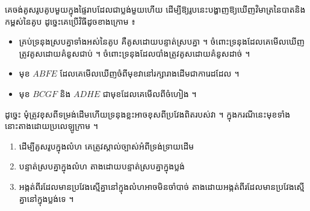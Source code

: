 \begin{example}[ឧទាហរណ៍]
គេចង់គូសរូបគូបមួយក្នុងផ្ទៃរាបដែលជាប្លង់មួយហើយ ដើម្បីឱ្យរូបនេះបង្ហាញឱ្យឃើញវិមាត្រនៃបាតនិងកម្ពស់នៃគូប ដូច្នេះគេប្រើវិធីដូចខាងក្រោម ៖
\end{example}
\begin{center}
\end{center}
\begin{itemize}
  \item គ្រប់ទ្រនុងស្របគ្នាទាំងអស់នៃគូប គឺគូសដោយបន្ទាត់ស្របគ្នា ។ ចំពោះទ្រនុងដែលគេមើលឃើញ ត្រូវគូសដោយគំនូសជាប់ ។ ចំពោះទ្រនុងដែលបាំងត្រូវគូសដោយគំនូសដាច់ ។
  \item មុខ $ABFE$ ដែលគេមើលឃើញចំពីមុខវានៅរក្សារាងដើមជាការេដដែល ។
  \item មុខ $BCGF$ និង $ADHE$ ជាមុខដែលគេមើលពីចំហៀង ។
\end{itemize}
ដូច្នេះ មុំត្រូវខុសពីទម្រង់ដើមហើយទ្រនុងខ្លះអាចខុសពីប្រវែងពិតរបស់វា ។ ក្នុងករណីនេះមុខទាំងនោះតាងដោយប្រលេឡូក្រាម ។

\begin{theorem}[សន្និដ្ឋាន]
\begin{enumerate}[1]
  \item ដើម្បីគូសរូបក្នុងលំហ គេត្រូវស្គាល់ច្បាស់អំពីទ្រង់ទ្រាយដើម
  \item បន្ទាត់ស្របគ្នាក្នុងលំហ តាងដោយបន្ទាត់ស្របគ្នាក្នុងប្លង់
  \item អង្កត់ពីរដែលមានប្រវែងស្មើគ្នានៅក្នុងលំហអាចមិនចាំបាច់ តាងដោយអង្កត់ពីរដែលមានប្រវែងស្មើគ្នានៅក្នុងប្លង់ទេ ។
\end{enumerate}
\end{theorem}

